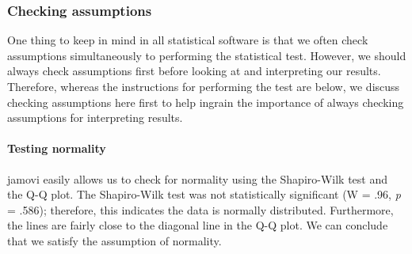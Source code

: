 \documentclass[
]{book}
\begin{document}
\hypertarget{checking-assumptions-1}{%
\subsubsection{Checking assumptions}\label{checking-assumptions-1}}

One thing to keep in mind in all statistical software is that we often check assumptions simultaneously to performing the statistical test. However, we should always check assumptions first before looking at and interpreting our results. Therefore, whereas the instructions for performing the test are below, we discuss checking assumptions here first to help ingrain the importance of always checking assumptions for interpreting results.

\hypertarget{testing-normality}{%
\paragraph{Testing normality}\label{testing-normality}}

jamovi easily allows us to check for normality using the Shapiro-Wilk test and the Q-Q plot. The Shapiro-Wilk test was not statistically significant (W = .96, \emph{p} = .586); therefore, this indicates the data is normally distributed. Furthermore, the lines are fairly close to the diagonal line in the Q-Q plot. We can conclude that we satisfy the assumption of normality.
\end{document}
